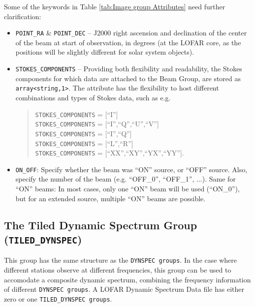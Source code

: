 \documentclass[a4paper,10pt,bibtotoc]{scrartcl}
\begin{document}
Some of the keywords in Table \ref{tab:Image group Attributes} need further clarification:

\begin{itemize}
\item \verb|POINT_RA| \& \verb|POINT_DEC| -- J2000 right ascension and 
  declination of the center of the beam at start of observation, in degrees (at the LOFAR core,
  as the positions will be slightly different for solar system objects).
\item \verb|STOKES_COMPONENTS| -- Providing both flexibility and readability,
  the Stokes components for which data are attached to the Beam Group, 
  are stored as \verb|array<string,1>|. 
  The attribute has the flexibility to host different combinations and types of
  Stokes data, such as e.g. 
  \begin{verse}
    \verb|STOKES_COMPONENTS| = [``I''] \\
    \verb|STOKES_COMPONENTS| = [``I'',``Q'',``U'',``V''] \\
    \verb|STOKES_COMPONENTS| = [``I'',``Q''] \\
    \verb|STOKES_COMPONENTS| = [``L'',``R''] \\
    \verb|STOKES_COMPONENTS| = [``XX'',``XY'',``YX'',``YY''].
  \end{verse}
\item \verb|ON_OFF|: Specify whether the beam was ``ON'' source, or ``OFF''
   source. Also, specify the number of the beam (e.g. ``OFF\_0'', 
   ``OFF\_1'', ...). Same for ``ON'' beams: In most cases, only one 
   ``ON'' beam will be used (``ON\_0''), but for an extended source, multiple
   ``ON'' beams are possible.  
\end{itemize}


\subsection{The Tiled Dynamic Spectrum Group ({\tt TILED\_DYNSPEC})}
\label{sec:tiled dynspec group}

This group has the same structure as the \texttt{DYNSPEC groups}. In the case
where different stations observe at different frequencies, this group can be used
to accomodate a composite dynamic spectrum, combining the frequency information of
different \texttt{DYNSPEC groups}. A LOFAR Dynamic Spectrum Data file has
either zero or one \texttt{TILED\_DYNSPEC groups}.
\end{document}
